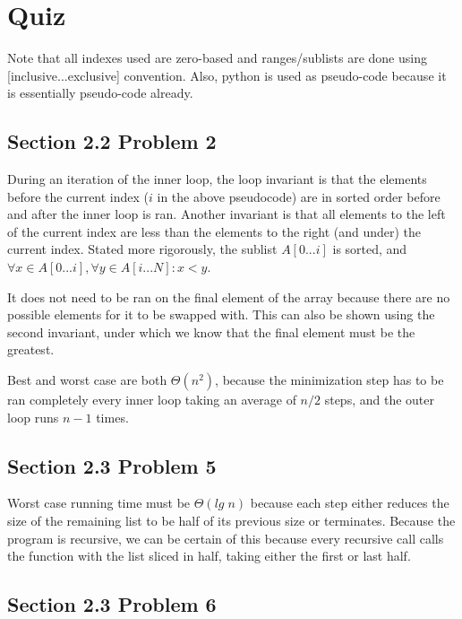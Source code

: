 \documentclass[12pt,letterpaper]{article}
\begin{document}
\section{Quiz}

Note that all indexes used are zero-based and ranges/sublists are done using [inclusive...exclusive]
convention. Also, python is used as pseudo-code because it is essentially pseudo-code already.

\subsection{Section 2.2 Problem 2}



During an iteration of the inner loop, the loop invariant is that the elements before
the current index ($i$ in the above pseudocode) are in sorted order before and after
the inner loop is ran. Another invariant is that all elements to the left of the current index
are less than the elements to the right (and under) the current index. Stated more rigorously, the
sublist $A[0...i]$ is sorted, and $\forall x \in A[0...i], \forall y \in A[i...N]: x < y$.

It does not need to be ran on the final element of the array because there are no
possible elements for it to be swapped with. This can also be shown using the second invariant,
under which we know that the final element must be the greatest.

Best and worst case are both $\Theta(n^2)$, because the minimization step has to be ran completely
every inner loop taking an average of $n/2$ steps, and the outer loop runs $n-1$ times.

\subsection{Section 2.3 Problem 5}



Worst case running time must be $\Theta(lg\;n)$ because each step either reduces the size of the
remaining list to be half of its previous size or terminates. Because the program is recursive, we
can be certain of this because every recursive call calls the function with the list sliced in half,
taking either the first or last half.

\subsection{Section 2.3 Problem 6}
\end{document}
